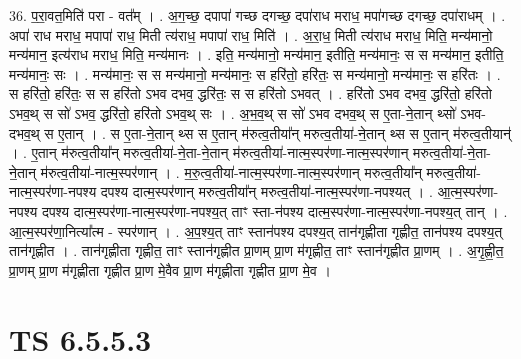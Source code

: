 \documentclass[17pt]{extarticle}
\begin{document}
36. प॒रा॒वत॒मिति॑ परा - वत᳚म् । . अ॒ग॒च्छ॒ दपापा॑ गच्छ दगच्छ॒ दपा॑राध मराध॒ मपा॑गच्छ दगच्छ॒ दपा॑राधम् । . अपा॑ राध मराध॒ मपापा॑ राध॒ मिती त्य॑राध॒ मपापा॑ राध॒ मिति॑ । . अ॒रा॒ध॒ मिती त्य॑राध मराध॒ मिति॒ मन्य॑मानो॒ मन्य॑मान॒ इत्य॑राध मराध॒ मिति॒ मन्य॑मानः । . इति॒ मन्य॑मानो॒ मन्य॑मान॒ इतीति॒ मन्य॑मानः॒ स स मन्य॑मान॒ इतीति॒ मन्य॑मानः॒ सः । . मन्य॑मानः॒ स स मन्य॑मानो॒ मन्य॑मानः॒ स हरि॑तो॒ हरि॑तः॒ स मन्य॑मानो॒ मन्य॑मानः॒ स हरि॑तः । . स हरि॑तो॒ हरि॑तः॒ स स हरि॑तो ऽभव दभव॒ द्धरि॑तः॒ स स हरि॑तो ऽभवत् । . हरि॑तो ऽभव दभव॒ द्धरि॑तो॒ हरि॑तो ऽभव॒थ् स सो॑ ऽभव॒ द्धरि॑तो॒ हरि॑तो ऽभव॒थ् सः । . अ॒भ॒व॒थ् स सो॑ ऽभव दभव॒थ् स ए॒ता-ने॒तान् थ्सो॑ ऽभव-दभव॒थ् स ए॒तान् । . स ए॒ता-ने॒तान् थ्स स ए॒तान् म॑रुत्व॒तीया᳚न् मरुत्व॒तीया॑-ने॒तान् थ्स स ए॒तान् म॑रुत्व॒तीयान्॑ । . ए॒तान् म॑रुत्व॒तीया᳚न् मरुत्व॒तीया॑-ने॒ता-ने॒तान् म॑रुत्व॒तीया॑-नात्म॒स्पर॑णा-नात्म॒स्पर॑णान् मरुत्व॒तीया॑-ने॒ता-ने॒तान् म॑रुत्व॒तीया॑-नात्म॒स्पर॑णान् । . म॒रु॒त्व॒तीया॑-नात्म॒स्पर॑णा-नात्म॒स्पर॑णान् मरुत्व॒तीया᳚न् मरुत्व॒तीया॑-नात्म॒स्पर॑णा-नपश्य दपश्य दात्म॒स्पर॑णान् मरुत्व॒तीया᳚न् मरुत्व॒तीया॑-नात्म॒स्पर॑णा-नपश्यत् । . आ॒त्म॒स्पर॑णा-नपश्य दपश्य दात्म॒स्पर॑णा-नात्म॒स्पर॑णा-नपश्य॒त् ताꣳ स्ता-न॑पश्य दात्म॒स्पर॑णा-नात्म॒स्पर॑णा-नपश्य॒त् तान् । . आ॒त्म॒स्पर॑णा॒नित्या᳚त्म - स्पर॑णान् । . अ॒प॒श्य॒त् ताꣳ स्तान॑पश्य दपश्य॒त् तान॑गृह्णीता गृह्णीत॒ तान॑पश्य दपश्य॒त् तान॑गृह्णीत । . तान॑गृह्णीता गृह्णीत॒ ताꣳ स्तान॑गृह्णीत प्रा॒णम् प्रा॒ण म॑गृह्णीत॒ ताꣳ स्तान॑गृह्णीत प्रा॒णम् । . अ॒गृ॒ह्णी॒त॒ प्रा॒णम् प्रा॒ण म॑गृह्णीता गृह्णीत प्रा॒ण मे॒वैव प्रा॒ण म॑गृह्णीता गृह्णीत प्रा॒ण मे॒व । \newline
\pagebreak
{}

\section{ TS 6.5.5.3 }
\end{document}
